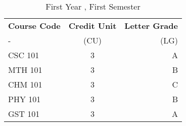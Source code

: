\documentclass{article}
\begin{document}
\begin{table}[h!]
	\begin{center}
		\caption{First Year , First Semester}
		\label{tab:table1}
		\begin{tabular}{|l|c|r|}
			\textbf{Course Code} & \textbf{Credit Unit} &
			\textbf{Letter Grade}\\
			- & (CU) & (LG) \\
			\hline
			CSC 101 & 3 & A\\
			MTH 101 & 3 & B\\
			CHM 101 & 3 & C\\
			PHY 101 & 3 & B\\
			GST 101 & 3 & A\\
			\end{tabular}
	\end{center}
\end{table}
\end{document}
